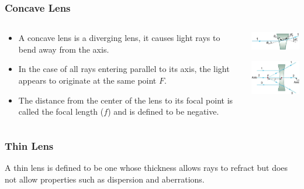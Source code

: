 \documentclass{beamer}
\begin{document}
\begin{frame}\frametitle{Concave Lens}
\begin{columns}
\begin{column}{6cm}
\begin{itemize}
\item A concave lens is a diverging lens, it causes light rays to bend away from the axis.
\item In the case of all rays entering parallel to its axis, the light appears to originate at the same point $F$.
\item The distance from the center of the lens to its focal point is called the focal length ($f$) and is defined to be negative.
\end{itemize}
\end{column}
\begin{column}{5cm}
\begin{center}
\includegraphics[width=4cm]{fig/concave1.jpg}

\vspace{0.25cm}
\includegraphics[width=4cm]{fig/concave2.jpg}
\end{center}
\end{column}
\end{columns}
\end{frame}

\begin{frame}\frametitle{Thin Lens}
A thin lens is defined to be one whose thickness allows rays to refract but does not allow properties such as dispersion and aberrations.
\end{frame}
\end{document}
